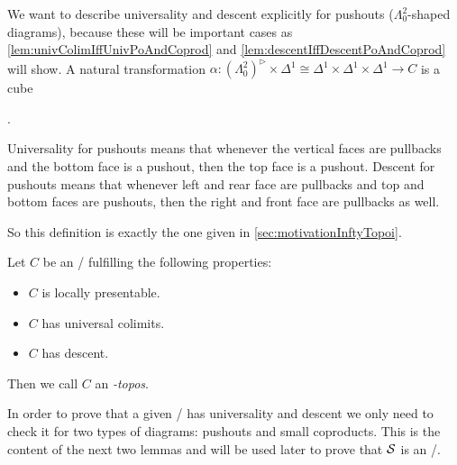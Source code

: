 \begin{remark}
    We want to describe universality and descent explicitly for pushouts ($\Lambda^2_0$-shaped diagrams), because these will be important cases as \cref{lem:univColimIffUnivPoAndCoprod} and \cref{lem:descentIffDescentPoAndCoprod} will show.
    A natural transformation $\alpha\colon\left(\Lambda_0^2\right)^{\rhd}\times\Delta^1\cong\Delta^1\times\Delta^1\times\Delta^1\to C$ is a cube
    \begin{center}
        \;.
    \end{center}
    Universality for pushouts means that whenever the vertical faces are pullbacks and the bottom face is a pushout, then the top face is a pushout.
    Descent for pushouts means that whenever left and rear face are pullbacks and top and bottom faces are pushouts, then the right and front face are pullbacks as well.
    
    So this definition is exactly the one given in \cref{sec:motivationInftyTopoi}.
\end{remark}
\begin{definition}
    Let $C$ be an \inftycat/ fulfilling the following properties:
    \begin{itemize}
        \item $C$ is locally presentable.
        \item $C$ has universal colimits.
        \item $C$ has descent.
    \end{itemize}
    Then we call $C$ an \emph{\infty-topos}.
\end{definition}
In order to prove that a given \inftycat/ has universality and descent we only need to check it for two types of diagrams: pushouts and small coproducts.
This is the content of the next two lemmas and will be used later to prove that $\mathcal{S}$ is an \inftytop/.

